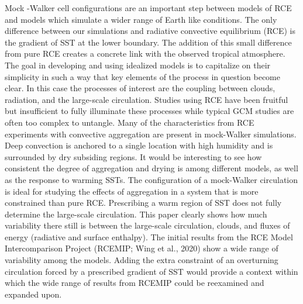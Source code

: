 \documentclass[draft]{agujournal2019}
\begin{document}
{%

Mock -Walker cell configurations are an important step between models of RCE and models which simulate a wider range of Earth like conditions.
The only difference between our simulations and radiative convective equilibrium (RCE) is the gradient of SST at the lower boundary.  
The addition of this small difference from pure RCE creates a concrete link with the observed tropical atmosphere.  
The goal in developing and using idealized models is to capitalize on their simplicity in such a way that key elements of the 
process in question become clear.  
In this case the processes of interest are the coupling between clouds, radiation, and the large-scale circulation.  
Studies using RCE have been fruitful but insufficient to fully illuminate these processes while typical GCM studies are often too complex to untangle.  
Many of the characteristics from RCE experiments with convective aggregation are present in mock-Walker simulations.   
Deep convection is anchored to a single location with high humidity and is surrounded by dry subsiding regions.  
It would be interesting to see how consistent the degree of aggregation and drying is among 
different models, as well as the response to warming SSTs.  The configuration of a mock-Walker circulation 
is ideal for studying the effects of aggregation in a system that is more constrained than pure RCE.     
Prescribing a warm region of SST does not fully determine the large-scale circulation.  
This paper clearly shows how much variability there still is between the large-scale circulation, clouds, 
and fluxes of energy (radiative and surface enthalpy).
The initial results from the RCE Model Intercomparison Project (RCEMIP; Wing et al., 2020) show a wide range of variability among the models.
Adding the extra constraint of an overturning circulation forced by a prescribed gradient of SST would provide a context within which the 
wide range of results from RCEMIP could be reexamined and expanded upon.  

}
\end{document}
